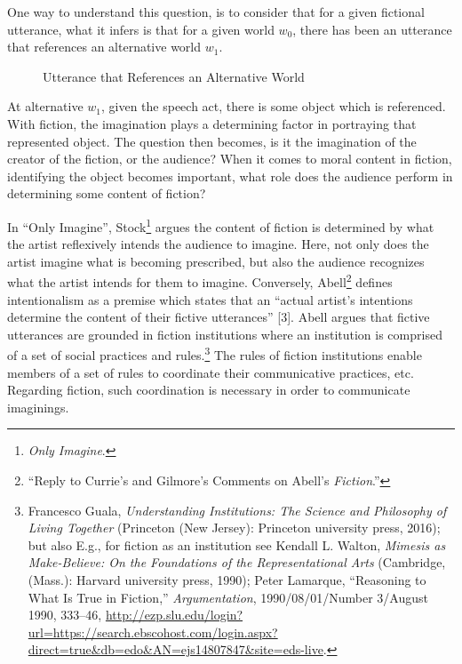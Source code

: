 \documentclass[phdthesis,12pt,final,a4paper]{wuthesis}
\theoremstyle{definition}
\theoremstyle{definition}
\theoremstyle{definition}
\theoremstyle{definition}
\theoremstyle{remark}
\begin{document}
One way to understand this question, is to consider that for a given fictional utterance, what it infers is that for a given world \(w_0\), there has been an utterance that references an alternative world \(w_1\).

\begin{figure}
\centering
\caption{Utterance that References an Alternative World}
\label{fig:utterance}
\end{figure}

At alternative \(w_1\), given the speech act, there is some object which is referenced. With fiction, the imagination plays a determining factor in portraying that represented object. The question then becomes, is it the imagination of the creator of the fiction, or the audience? When it comes to moral content in fiction, identifying the object becomes important, what role does the audience perform in determining some content of fiction?

In ``Only Imagine'', Stock\footnote{\emph{Only Imagine}.} argues the content of fiction is determined by what the artist reflexively intends the audience to imagine. Here, not only does the artist imagine what is becoming prescribed, but also the audience recognizes what the artist intends for them to imagine. Conversely, Abell\footnote{{``Reply to {Currie}'s and {Gilmore}'s Comments on {Abell}'s {\emph{Fiction}}.''}} defines intentionalism as a premise which states that an ``actual artist's intentions determine the content of their fictive utterances'' {[}3{]}. Abell argues that fictive utterances are grounded in fiction institutions where an institution is comprised of a set of social practices and rules.\footnote{Francesco Guala, \emph{Understanding Institutions: The Science and Philosophy of Living Together} (Princeton (New Jersey): Princeton university press, 2016); but also E.g., for fiction as an institution see Kendall L. Walton, \emph{Mimesis as {Make-Believe}: {On} the {Foundations} of the {Representational Arts}} (Cambridge, (Mass.): Harvard university press, 1990); Peter Lamarque, {``Reasoning to {What} Is {True} in {Fiction},''} \emph{Argumentation}, 1990/08/01/Number 3/August 1990, 333--46, \url{http://ezp.slu.edu/login?url=https://search.ebscohost.com/login.aspx?direct=true&db=edo&AN=ejs14807847&site=eds-live}.} The rules of fiction institutions enable members of a set of rules to coordinate their communicative practices, etc. Regarding fiction, such coordination is necessary in order to communicate imaginings.
\end{document}
